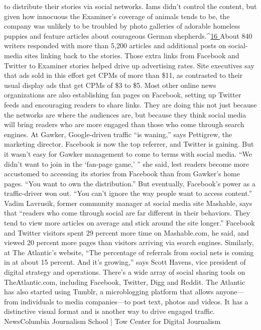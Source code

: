 to distribute their stories via social networks. Iams didn’t control the content, but
given how innocuous the Examiner’s coverage of animals tends to be, the company
was unlikely to be troubled by photo galleries of adorable homeless puppies
and feature articles about courageous German shepherds.^{\href{#endnotes-ch2}{16 }}About 840 writers
responded with more than 5,200 articles and additional posts on social-media
sites linking back to the stories. Those extra links from Facebook and Twitter to
Examiner stories helped drive up advertising rates. Site executives say that ads
sold in this effort get CPMs of more than \$11, as contrasted to their usual display
ads that get CPMs of \$3 to \$5.
Most other online news organizations are also establishing fan pages on Facebook,
setting up Twitter feeds and encouraging readers to share links. They are
doing this not just because the networks are where the audiences are, but because
they think social media will bring readers who are more engaged than those
who come through search engines. At Gawker, Google-driven traffic ``is waning,''
says Pettigrew, the marketing director. Facebook is now the top referrer, and
Twitter is gaining. But it wasn’t easy for Gawker management to come to terms
with social media. ``We didn’t want to join in the ‘fan-page game,’ '' she said, lest
readers become more accustomed to accessing its stories from Facebook than
from Gawker’s home pages. ``You want to own the distribution.'' But eventually,
Facebook’s power as a traffic-driver won out. ``You can’t ignore the way people
want to access content.''
Vadim Lavrusik, former community manager at social media site Mashable,
says that ``readers who come through social are far different in their behaviors.
They tend to view more articles on average and stick around the site longer.''
Facebook and Twitter visitors spent 29 percent more time on Mashable.com, he
said, and viewed 20 percent more pages than visitors arriving via search engines.
Similarly, at The Atlantic’s website, ``The percentage of referrals from social
nets is coming in at about 15 percent. And it’s growing,'' says Scott Havens, vice
president of digital strategy and operations. There’s a wide array of social sharing
tools on TheAtlantic.com, including Facebook, Twitter, Digg and Reddit. The
Atlantic has also started using Tumblr, a microblogging platform that allows anyone—
from individuals to media companies—to post text, photos and videos. It
has a distinctive visual format and is another way to drive engaged traffic. NewsColumbia
Journalism School | Tow Center for Digital Journalism
